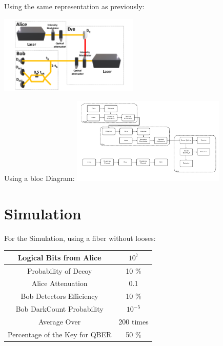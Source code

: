 \documentclass[1000pt]{article}
\newcommand{\mysection}[1]{\section*{\color{black}\sffamily #1}}%
\begin{document}
\begin{multicols}{2}
Using the same representation as previously:

    	\centering
    	\includegraphics[width=0.5\textwidth]{./figures/E.pdf}
    \columnbreak
    
Using a bloc Diagram:
    	\centering
    	\includegraphics[width=0.55\textwidth]{./figures/Diagrama_de_blocos.pdf}

\end{multicols}    
\mysection{\Huge\textbf{Simulation}} \Large \vspace*{1cm}

For the Simulation, using a fiber without looses:
\begin{table}[hbt!]
\centering
\Large
\begin{tabular}{|c|c|}
\hline
\cellcolor[HTML]{005288}\color{white} Logical Bits from Alice & $10^{7}$\\ \hline
\cellcolor[HTML]{005288}\color{white} Probability of Decoy & 10 \% \\ \hline
\cellcolor[HTML]{005288}\color{white} Alice Attenuation & 0.1\\ \hline
\cellcolor[HTML]{005288}\color{white} Bob Detectors Efficiency  & 10 \% \\ \hline
\cellcolor[HTML]{005288}\color{white} Bob DarkCount Probability & $10^{-5}$ \\ \hline
\cellcolor[HTML]{005288}\color{white} Average Over & 200 times\\ \hline
\cellcolor[HTML]{005288}\color{white} Percentage of the Key for QBER & 50 \% \\ \hline

\end{tabular}
\end{table}
\end{document}
